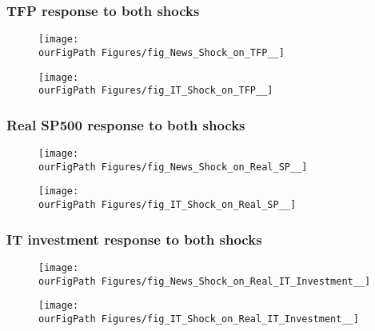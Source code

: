 \documentclass{beamer}
\def \ourFigPath {../../}
\begin{document}
\begin{frame}
\frametitle{TFP response to both shocks}
\begin{figure}
	\centering
	\texttt{[image: \\ourFigPath Figures/fig\_News\_Shock\_on\_TFP\_\_]} %
\end{figure}
\begin{figure}
	\centering
	\texttt{[image: \\ourFigPath Figures/fig\_IT\_Shock\_on\_TFP\_\_]}
\end{figure}
\end{frame}

\begin{frame}
\frametitle{Real SP500 response to both shocks}
\begin{figure}
	\centering
	\texttt{[image: \\ourFigPath Figures/fig\_News\_Shock\_on\_Real\_SP\_\_]}
\end{figure}
\begin{figure}
	\centering
	\texttt{[image: \\ourFigPath Figures/fig\_IT\_Shock\_on\_Real\_SP\_\_]}
\end{figure}
\end{frame}

\begin{frame}
\frametitle{IT investment response to both shocks}
\begin{figure}
	\centering
	\texttt{[image: \\ourFigPath Figures/fig\_News\_Shock\_on\_Real\_IT\_Investment\_\_]}
\end{figure}
\begin{figure}
	\centering
	\texttt{[image: \\ourFigPath Figures/fig\_IT\_Shock\_on\_Real\_IT\_Investment\_\_]}
\end{figure}
\end{frame}
\end{document}
